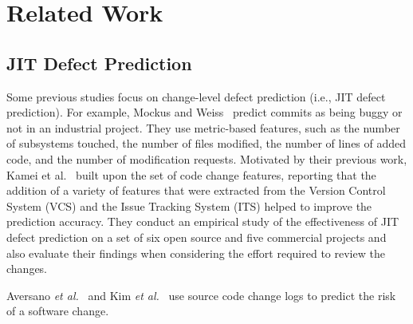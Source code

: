 \section{Related Work}
\label{sec:related}
\subsection{JIT Defect Prediction}
Some previous studies focus on change-level defect prediction (i.e., JIT defect prediction). For example, Mockus and Weiss~\cite{Mockus2000} predict commits as being buggy or not in an industrial project. They use metric-based features, such as the number of subsystems touched, the number of files modified, the number of lines of added code, and the number of modification requests. Motivated by their previous work, Kamei et al.~\cite{Kamei:2013:LES} built upon the set of code change features, reporting that the addition of a variety of features that were extracted from the Version Control System (VCS) and the Issue Tracking System (ITS) helped to improve the prediction accuracy. They conduct an empirical study of the effectiveness of JIT defect prediction on a set of six open source and five commercial projects and also evaluate their findings when considering the effort required to review the changes.

Aversano \emph{et al.}~\cite{Aversano2007} and Kim \emph{et al.}~\cite{Kim2008} use source code change logs to predict the risk of a software change.





